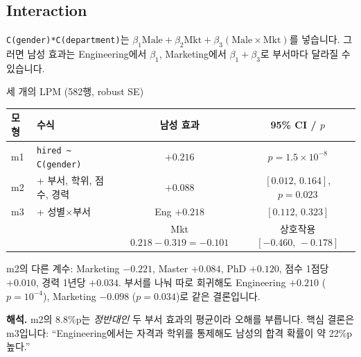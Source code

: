\documentclass[11pt,a4paper]{article}
\newcommand{\code}[1]{\texttt{#1}}
\begin{document}
\subsection{Interaction}
\code{C(gender)*C(department)}는 $\beta_1\text{Male}+\beta_2\text{Mkt}+\beta_3(\text{Male}\times\text{Mkt})$를 넣습니다. 그러면 남성 효과는 Engineering에서 $\beta_1$, Marketing에서 $\beta_1+\beta_3$로 부서마다 달라질 수 있습니다.

\begin{databox}{세 개의 LPM (582행, robust SE)}
\begin{center}
\begin{tabular}{@{}l l c c@{}}
\toprule
모형 & 수식 & 남성 효과 & 95\% CI / $p$ \\
\midrule
m1 & \code{hired \~{} C(gender)} & $+0.216$ & $p=1.5\times10^{-8}$ \\
m2 & + 부서, 학위, 점수, 경력 & $+0.088$ & $[0.012,\,0.164]$, $p=0.023$ \\
m3 & + 성별$\times$부서 & Eng $+0.218$ & $[0.112,\,0.323]$ \\
 & & Mkt $0.218-0.319=-0.101$ & 상호작용 $[-0.460,\,-0.178]$ \\
\bottomrule
\end{tabular}
\end{center}
m2의 다른 계수: Marketing $-0.221$, Master $+0.084$, PhD $+0.120$, 점수 1점당 $+0.010$, 경력 1년당 $+0.034$. 부서를 나눠 따로 회귀해도 Engineering $+0.210$ ($p=10^{-4}$), Marketing $-0.098$ ($p=0.034$)로 같은 결론입니다.

\textbf{해석.} m2의 8.8\%p는 \emph{정반대인} 두 부서 효과의 평균이라 오해를 부릅니다. 핵심 결론은 m3입니다: ``Engineering에서는 자격과 학위를 통제해도 남성의 합격 확률이 약 22\%p 높다.''
\end{databox}
\end{document}
